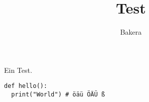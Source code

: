 \documentclass[12pt,a4paper]{scrartcl}
\author{Bakera}
\title{Test}
\begin{document}
Ein Test.

\begin{lstlisting}
def hello():
  print("World") # öäü ÖÄÜ ß
\end{lstlisting}
	
\end{document}
